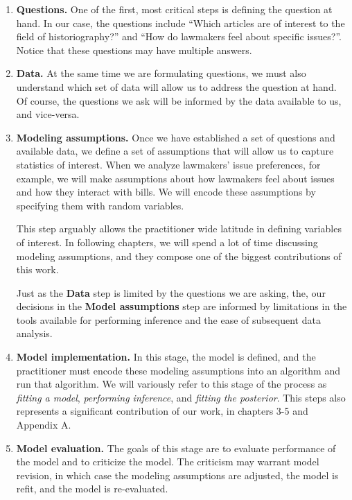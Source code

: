 \begin{enumerate}
\item \textbf{Questions.} One of the first, most critical steps is
  defining the question at hand.  In our case, the questions include
  ``Which articles are of interest to the field of historiography?''
  and ``How do lawmakers feel about specific issues?''. Notice that
  these questions may have multiple answers.

\item \textbf{Data.} At the same time we are formulating questions, we
  must also understand which set of data will allow us to address the
  question at hand.  Of course, the questions we ask will be informed
  by the data available to us, and vice-versa.

\item \textbf{Modeling assumptions.} Once we have established a set of
  questions and available data, we define a set of assumptions that
  will allow us to capture statistics of interest.  When we analyze
  lawmakers' issue preferences, for example, we will make assumptions
  about how lawmakers feel about issues and how they interact with
  bills.  We will encode these assumptions by specifying them with
  random variables.

  This step arguably allows the practitioner wide latitude in defining
  variables of interest.  In following chapters, we will spend a lot
  of time discussing modeling assumptions, and they compose one of the
  biggest contributions of this work.

  Just as the \textbf{Data} step is limited by the questions we are
  asking, the, our decisions in the \textbf{Model assumptions} step
  are informed by limitations in the tools available for performing
  inference and the ease of subsequent data analysis.

  \item \textbf{Model implementation.} In this stage, the model is
  defined, and the practitioner must encode these modeling assumptions
  into an algorithm and run that algorithm.  We will variously refer
  to this stage of the process as \emph{fitting a model},
  \emph{performing inference}, and \emph{fitting the posterior}.  This
  steps also represents a significant contribution of our work, in
  chapters 3-5 and Appendix A.

  \item \textbf{Model evaluation.} The goals of this stage are to
    evaluate performance of the model and to criticize the model.
    The criticism may warrant model revision, in which case the
    modeling assumptions are adjusted, the model is refit, and the
    model is re-evaluated.


\end{enumerate}
